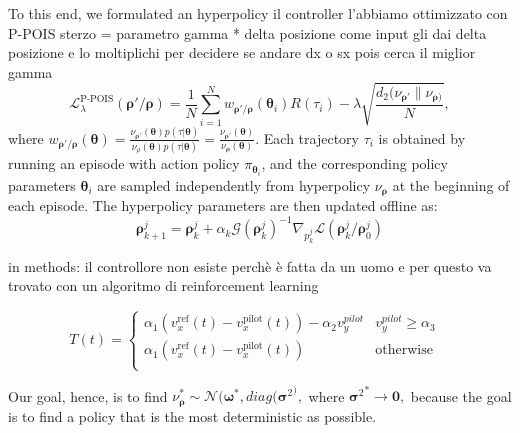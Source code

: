 To this end, we formulated an hyperpolicy 
il controller l'abbiamo ottimizzato con P-POIS
sterzo = parametro gamma * delta posizione
come input gli dai delta posizione e lo moltiplichi per decidere se andare dx o sx
pois cerca il miglior gamma
\begin{equation}\mathcal{L}_\lambda^{\text{P-POIS}}(\boldsymbol \rho'/\boldsymbol \rho)=\frac{1}{N} \sum^N_{i=1}w_{\boldsymbol \rho'/ \boldsymbol\rho}(\boldsymbol \theta_i)R(\tau_i)-\lambda\sqrt{\frac{d_2(\nu_{\boldsymbol \rho'}\|\nu_{\boldsymbol \rho)}}{N}},\end{equation} where \(w_{\boldsymbol \rho'/\boldsymbol \rho}(\boldsymbol \theta)=\frac{\nu_{\boldsymbol\rho'}(\boldsymbol\theta)p(\tau|\boldsymbol \theta)}{\nu_\rho(\boldsymbol\theta)p(\tau|\boldsymbol \theta)}=\frac{\nu_{\boldsymbol\rho'}(\boldsymbol\theta)}{\nu_{\boldsymbol \rho}(\boldsymbol\theta)}.\)
Each trajectory $\tau_i$ is obtained by running an episode with action policy $\pi_{\boldsymbol \theta_i}$, and the corresponding policy parameters $\boldsymbol \theta_i$ are sampled independently from hyperpolicy $\nu_{\boldsymbol \rho}$ at the beginning of each episode. The hyperpolicy parameters are then updated offline as: \begin{equation}\boldsymbol \rho^j_{k+1}=\boldsymbol \rho^j_k+\alpha_k\mathcal{G}(\boldsymbol \rho_k^j)^{-1}\nabla_{p_k^j}\mathcal{L}(\boldsymbol\rho^j_k/\boldsymbol \rho^j_0)\end{equation}




in methods: il controllore non esiste perchè è fatta da un uomo e per questo va trovato con un algoritmo di reinforcement learning



\begin{equation}
  T(t) =
    \begin{cases}
      \alpha_1(v_x^{\text{ref}}(t)-v_x^{\text{pilot}}(t))-\alpha_2 v_y^{pilot} &
      \text{$v_y^{pilot} \geq \alpha_3$ }\\
      \alpha_1(v_x^{\text{ref}}(t)-v_x^{\text{pilot}}(t)) &
      \text{otherwise}\\
    \end{cases}       
\end{equation}





Our goal, hence, is to find $\nu_{\boldsymbol \rho}^* \sim \mathcal{N}(\boldsymbol \omega^*,diag({\boldsymbol {\sigma}^{2}}^),$ where ${\boldsymbol {\sigma}^{2}}^* \rightarrow \boldsymbol 0,$ because the goal is to find a policy that is the most deterministic as possible.

